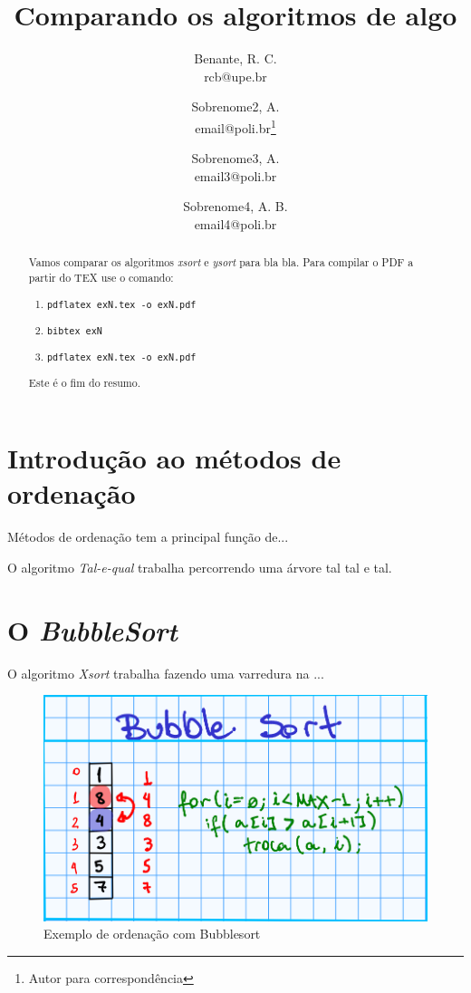 \documentclass[a4paper,10pt]{article} %
\title{Comparando os algoritmos de algo}
\author{Benante, R. C.\setfoot{upe}{Universidade de Pernambuco}\\ rcb@upe.br \and
Sobrenome2, A.\getfoot{upe}\\ email@poli.br\footnote{Autor para correspondência} \and
Sobrenome3, A.\getfoot{upe}\\ email3@poli.br \and
Sobrenome4, A. B.\getfoot{upe}\\ email4@poli.br}
\begin{document}
\maketitle


\begin{abstract}

Vamos comparar os algoritmos \textit{xsort} e \textit{ysort} para bla bla.
Para compilar o PDF a partir do TEX use o comando:

\begin{enumerate}
 \item \texttt{pdflatex exN.tex -o exN.pdf}
 \item \texttt{bibtex exN}
 \item \texttt{pdflatex exN.tex -o exN.pdf}
\end{enumerate}

Este é o fim do resumo.

\end{abstract}



\section{Introdução ao métodos de ordenação}

Métodos de ordenação tem a principal função de...

O algoritmo \textit{Tal-e-qual} trabalha percorrendo uma árvore tal tal e tal.

\section{O \textit{BubbleSort}}

O algoritmo \emph{Xsort} trabalha fazendo uma varredura na ...

\begin{figure}[ht]
\centering
\includegraphics[width=.80\linewidth]{bubble.png}
\caption{Exemplo de ordenação com Bubblesort}
\label{fig:xsort}
\end{figure}
\end{document}
